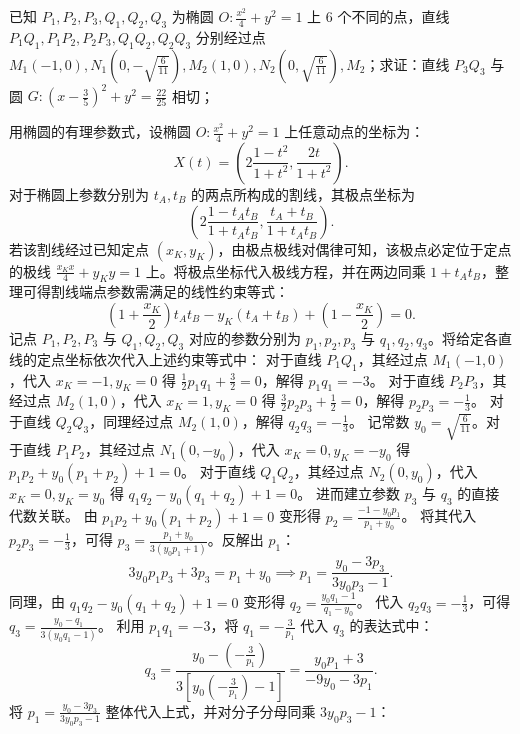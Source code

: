 \begin{example}
已知 \(P_1,P_2,P_3,Q_1,Q_2,Q_3\) 为椭圆 \(O: \frac{x^2}{4} + y^2 = 1\) 上 6 个不同的点，直线 \(P_1Q_1,P_1P_2,P_2P_3,Q_1Q_2,Q_2Q_3\) 分别经过点 \(M_1(-1,0),N_1\left(0,-\sqrt{\frac{6}{11}}\right),M_2(1,0),N_2\left(0,\sqrt{\frac{6}{11}}\right),M_2\)；求证：直线 \(P_3Q_3\) 与圆 \(G: \left(x - \frac{3}{5}\right)^2 + y^2 = \frac{22}{25}\) 相切；
\end{example}
\begin{solution}
用椭圆的有理参数式，设椭圆 $O: \frac{x^2}{4} + y^2 = 1$ 上任意动点的坐标为：
\[
X(t) = \left( 2\frac{1-t^2}{1+t^2}, \frac{2t}{1+t^2} \right).
\]
对于椭圆上参数分别为 $t_A, t_B$ 的两点所构成的割线，其极点坐标为
\[
\left( 2\frac{1-t_At_B}{1+t_At_B}, \frac{t_A+t_B}{1+t_At_B} \right).
\]
若该割线经过已知定点 $(x_K, y_K)$，由极点极线对偶律可知，该极点必定位于定点的极线 $\frac{x_K x}{4} + y_K y = 1$ 上。将极点坐标代入极线方程，并在两边同乘 $1+t_At_B$，整理可得割线端点参数需满足的线性约束等式：
\[
\left(1 + \frac{x_K}{2}\right) t_A t_B - y_K (t_A+t_B) + \left(1 - \frac{x_K}{2}\right) = 0.
\]
记点 $P_1, P_2, P_3$ 与 $Q_1, Q_2, Q_3$ 对应的参数分别为 $p_1, p_2, p_3$ 与 $q_1, q_2, q_3$。将给定各直线的定点坐标依次代入上述约束等式中：
对于直线 $P_1Q_1$，其经过点 $M_1(-1,0)$，代入 $x_K = -1, y_K = 0$ 得 $\frac{1}{2} p_1 q_1 + \frac{3}{2} = 0$，解得 $p_1 q_1 = -3$。
对于直线 $P_2P_3$，其经过点 $M_2(1,0)$，代入 $x_K = 1, y_K = 0$ 得 $\frac{3}{2} p_2 p_3 + \frac{1}{2} = 0$，解得 $p_2 p_3 = -\frac{1}{3}$。
对于直线 $Q_2Q_3$，同理经过点 $M_2(1,0)$，解得 $q_2 q_3 = -\frac{1}{3}$。
记常数 $y_0 = \sqrt{\frac{6}{11}}$。对于直线 $P_1P_2$，其经过点 $N_1(0,-y_0)$，代入 $x_K = 0, y_K = -y_0$ 得 $p_1 p_2 + y_0(p_1+p_2) + 1 = 0$。
对于直线 $Q_1Q_2$，其经过点 $N_2(0,y_0)$，代入 $x_K = 0, y_K = y_0$ 得 $q_1 q_2 - y_0(q_1+q_2) + 1 = 0$。
进而建立参数 $p_3$ 与 $q_3$ 的直接代数关联。
由 $p_1 p_2 + y_0(p_1+p_2) + 1 = 0$ 变形得 $p_2 = \frac{-1-y_0 p_1}{p_1+y_0}$。
将其代入 $p_2 p_3 = -\frac{1}{3}$，可得 $p_3 = \frac{p_1+y_0}{3(y_0 p_1 + 1)}$。反解出 $p_1$：
\[
3 y_0 p_1 p_3 + 3 p_3 = p_1 + y_0 \implies p_1 = \frac{y_0 - 3 p_3}{3 y_0 p_3 - 1}.
\]
同理，由 $q_1 q_2 - y_0(q_1+q_2) + 1 = 0$ 变形得 $q_2 = \frac{y_0 q_1 - 1}{q_1 - y_0}$。
代入 $q_2 q_3 = -\frac{1}{3}$，可得 $q_3 = \frac{y_0 - q_1}{3(y_0 q_1 - 1)}$。
利用 $p_1 q_1 = -3$，将 $q_1 = -\frac{3}{p_1}$ 代入 $q_3$ 的表达式中：
\[
q_3 = \frac{y_0 - \left(-\frac{3}{p_1}\right)}{3\left[y_0\left(-\frac{3}{p_1}\right) - 1\right]} = \frac{y_0 p_1 + 3}{-9y_0 - 3p_1}.
\]
将 $p_1 = \frac{y_0 - 3p_3}{3y_0 p_3 - 1}$ 整体代入上式，并对分子分母同乘 $3 y_0 p_3 - 1$：

\end{solution}
